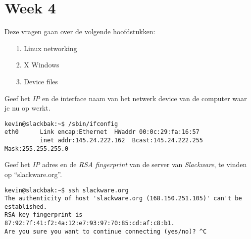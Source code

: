 %
%
%
%

\section{Week 4}
Deze vragen gaan over de volgende hoofdstukken:
\begin{itemize}
\item[1.] Linux networking
\item[2.] X Windows
\item[3.] Device files
\end{itemize}

\question[10] Geef het \emph{IP} en de interface naam van het netwerk device van de computer waar je nu op werkt. 
\begin{solution}
\begin{lstlisting}
kevin@slackbak:~$ /sbin/ifconfig 
eth0      Link encap:Ethernet  HWaddr 00:0c:29:fa:16:57  
          inet addr:145.24.222.162  Bcast:145.24.222.255  Mask:255.255.255.0
\end{lstlisting}%
\end{solution}

\question[10] Geef het \emph{IP} adres en de \emph{RSA fingerprint} van de server van \emph{Slackware}, te vinden op ``slackware.org''. 
\begin{solution}
\begin{lstlisting}
kevin@slackbak:~$ ssh slackware.org
The authenticity of host 'slackware.org (168.150.251.105)' can't be established.
RSA key fingerprint is 87:92:7f:41:f2:4a:12:e7:93:97:70:85:cd:af:c8:b1.
Are you sure you want to continue connecting (yes/no)? ^C
\end{lstlisting}%
\end{solution}


